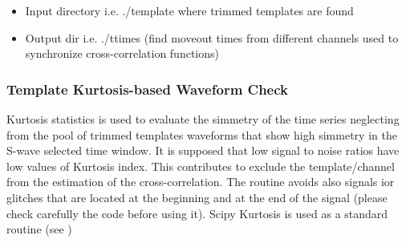 \documentclass[a4paper,10pt,english]{sphinxmanual}
\begin{document}
\begin{sphinxVerbatim}[commandchars=\\\{\}]
         
  
 
\end{sphinxVerbatim}
\begin{itemize}
\item {} 
Input directory i.e. ./template where trimmed templates are found

\item {} 
Output dir i.e. ./ttimes (find moveout times from different channels used to synchronize cross-correlation functions)

\end{itemize}


\subsubsection{Template Kurtosis-based Waveform Check}
\label{\detokenize{sub/input.template_check:template-kurtosis-based-waveform-check}}\label{\detokenize{sub/input.template_check::doc}}
Kurtosis statistics is used to evaluate the simmetry of the time series neglecting from the pool of trimmed templates
waveforms that show high simmetry in the S-wave selected time window. It is supposed that low signal to noise ratios
have low values of Kurtosis index. This contributes to exclude the template/channel from the estimation of the cross-correlation.
The routine avoids also signals ior glitches that are located at the beginning and at the end of the signal (please check carefully the code
before using it).
Scipy Kurtosis is used as a standard routine (see )
\end{document}
